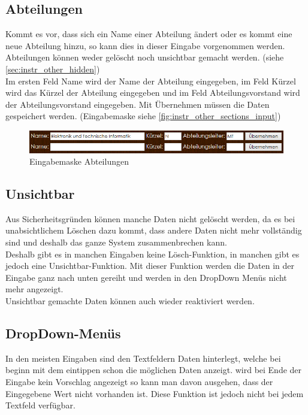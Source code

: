 \subsection{Abteilungen}
Kommt es vor, dass sich ein Name einer Abteilung ändert oder es kommt eine neue Abteilung hinzu, so kann dies in dieser Eingabe vorgenommen werden. Abteilungen können weder gelöscht noch unsichtbar gemacht werden. (siehe \autoref{sec:instr_other_hidden})\\
Im ersten Feld Name wird der Name der Abteilung eingegeben, im Feld Kürzel wird das Kürzel der Abteilung eingegeben und im Feld Abteilungsvorstand wird der Abteilungsvorstand eingegeben. Mit Übernehmen müssen die Daten gespeichert werden. (Eingabemaske siehe \autoref{fig:instr_other_sections_input})
\begin{figure}[H]
\centering
\includegraphics[keepaspectratio=true, width=17cm]{images/screenshots/sections_input.png}
\caption{Eingabemaske Abteilungen}
\label{fig:instr_other_sections_input}
\end{figure}
\subsection{Unsichtbar}\label{sec:instr_other_hidden}
Aus Sicherheitsgründen können manche Daten nicht gelöscht werden, da es bei unabsichtlichem Löschen dazu kommt, dass andere Daten nicht mehr vollständig sind und deshalb das ganze System zusammenbrechen kann.\\
Deshalb gibt es in manchen Eingaben keine Lösch-Funktion, in manchen gibt es jedoch eine Unsichtbar-Funktion. Mit dieser Funktion werden die Daten in der Eingabe ganz nach unten gereiht und werden in den DropDown Menüs nicht mehr angezeigt.\\
Unsichtbar gemachte Daten können auch wieder reaktiviert werden.
\subsection{DropDown-Menüs}
In den meisten Eingaben sind den Textfeldern Daten hinterlegt, welche bei beginn mit dem eintippen schon die möglichen Daten anzeigt. wird bei Ende der Eingabe kein Vorschlag angezeigt so kann man davon ausgehen, dass der Eingegebene Wert nicht vorhanden ist. Diese Funktion ist jedoch nicht bei jedem Textfeld verfügbar.